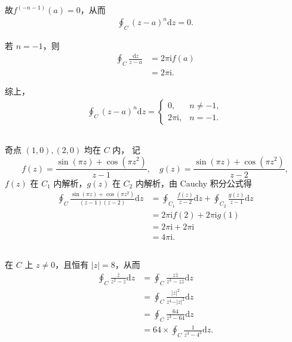 \documentclass[12pt]{article}
\begin{document}
故\( f^{(-n-1)}(a) = 0 \)，从而
\begin{align*}
\oint_C \left( z-a \right)^n \mathrm{d}z = 0.
\end{align*}

若 \( n = -1 \)，则
\begin{align*}
\oint_C \frac{\mathrm{d}z}{z-a} &= 2\pi\mathrm{i} f(a) \\
&= 2\pi\mathrm{i}.
\end{align*}

综上，
\begin{align*}
\oint_C \left( z-a \right)^n \mathrm{d}z =
\begin{cases}
0, & n \neq -1, \\
2\pi\mathrm{i}, & n = -1.
\end{cases}
\end{align*}
\subsection{}
奇点 \( (1,0),(2,0) \) 均在 \( C \) 内，
记
\[
f(z) = \frac{\sin\left( \pi z \right) + \cos\left( \pi z^2 \right)}{z-1}, \quad g(z) = \frac{\sin\left( \pi z \right) + \cos\left( \pi z^2 \right)}{z-2},
\]
\( f(z) \) 在 \( C_1 \) 内解析，\( g(z) \) 在 \( C_2 \) 内解析，由 Cauchy 积分公式得
\begin{align*}
\oint_C \frac{\sin\left( \pi z \right) + \cos\left( \pi z^2 \right)}{\left( z-1 \right)\left( z-2 \right)} \mathrm{d}z &= \oint_{C_1} \frac{f(z)}{z-2} \mathrm{d}z + \oint_{C_2} \frac{g(z)}{z-1} \mathrm{d}z \\
&= 2\pi\mathrm{i} f(2) + 2\pi\mathrm{i} g(1) \\
&= 2\pi\mathrm{i} + 2\pi\mathrm{i} \\
&= 4\pi\mathrm{i}.
\end{align*}
\subsection{}
在 \( C \) 上 \( z \neq 0 \)，且恒有 \( \vert z \vert = 8 \)，从而
\begin{align*}
\oint_C \frac{\overline{z}}{z^2 - \overline{z}} \mathrm{d}z &= \oint_C \frac{z\overline{z}}{z^3 - z\overline{z}} \mathrm{d}z \\
&= \oint_C \frac{\vert z \vert^2}{z^3 - \vert z \vert^2} \mathrm{d}z \\
&= \oint_C \frac{64}{z^3 - 64} \mathrm{d}z \\
&= 64 \times \oint_C \frac{1}{z^3 - 4^3} \mathrm{d}z.
\end{align*}
\end{document}
